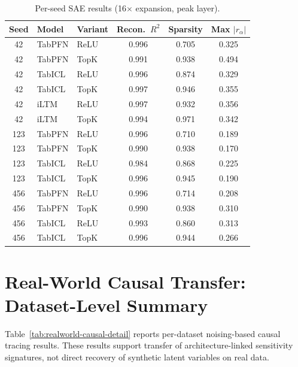 \documentclass{article}
\begin{document}
\begin{table}[htbp]
\centering
\caption{Per-seed SAE results (16$\times$ expansion, peak layer).}
\label{tab:perseed-sae}
\small
\begin{tabular}{@{}c l l ccc@{}}
\toprule
Seed & Model & Variant & Recon.\ $R^2$ & Sparsity & Max $|r_\alpha|$ \\
\midrule
42 & TabPFN & ReLU & 0.996 & 0.705 & 0.325 \\
42 & TabPFN & TopK & 0.991 & 0.938 & 0.494 \\
42 & TabICL & ReLU & 0.996 & 0.874 & 0.329 \\
42 & TabICL & TopK & 0.997 & 0.946 & 0.355 \\
42 & iLTM & ReLU & 0.997 & 0.932 & 0.356 \\
42 & iLTM & TopK & 0.994 & 0.971 & 0.342 \\
\midrule
123 & TabPFN & ReLU & 0.996 & 0.710 & 0.189 \\
123 & TabPFN & TopK & 0.990 & 0.938 & 0.170 \\
123 & TabICL & ReLU & 0.984 & 0.868 & 0.225 \\
123 & TabICL & TopK & 0.996 & 0.945 & 0.190 \\
\midrule
456 & TabPFN & ReLU & 0.996 & 0.714 & 0.208 \\
456 & TabPFN & TopK & 0.990 & 0.938 & 0.310 \\
456 & TabICL & ReLU & 0.993 & 0.860 & 0.313 \\
456 & TabICL & TopK & 0.996 & 0.944 & 0.266 \\
\bottomrule
\end{tabular}
\end{table}

\section{Real-World Causal Transfer: Dataset-Level Summary}
\label{app:realworld-detail}

Table~\ref{tab:realworld-causal-detail} reports per-dataset noising-based causal tracing results. These results support transfer of architecture-linked sensitivity signatures, not direct recovery of synthetic latent variables on real data.
\end{document}
